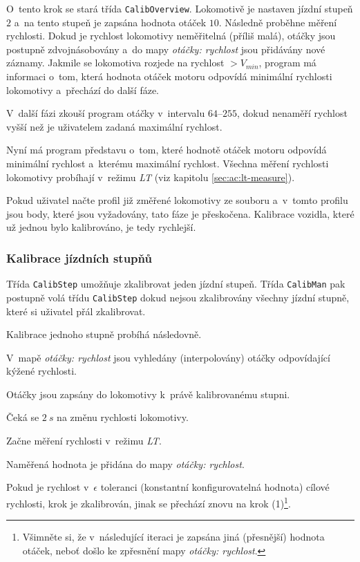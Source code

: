 O~tento krok se stará třída \texttt{CalibOverview}.
Lokomotivě je nastaven jízdní stupeň $2$ a~na tento stupeň je zapsána hodnota otáček
$10$. Následně proběhne měření rychlosti. Dokud je rychlost lokomotivy
neměřitelná (příliš malá), otáčky jsou postupně zdvojnásobovány a~do mapy
\textit{otáčky: rychlost} jsou přidávány nové záznamy. Jakmile se lokomotiva
rozjede na rychlost $> V_{min}$, program má informaci o~tom, která hodnota
otáček motoru odpovídá minimální rychlosti lokomotivy a~přechází do další fáze.

V~další fázi zkouší program otáčky v~intervalu $64$--$255$, dokud nenaměří
rychlost vyšší než je uživatelem zadaná maximální rychlost.

Nyní má program představu o~tom, které hodnotě otáček motoru odpovídá minimální
rychlost a~kterému maximální rychlost. Všechna měření rychlosti lokomotivy
probíhají v~režimu \textit{\gls{LT}} (viz kapitolu \ref{sec:ac:lt-measure}).

Pokud uživatel načte profil již změřené lokomotivy ze souboru a~v~tom\-to profilu
jsou body, které jsou vyžadovány, tato fáze je přeskočena. Kalibrace vozidla,
které už jednou bylo kalibrováno, je tedy rychlejší.

\subsubsection{Kalibrace jízdních stupňů}

Třída \texttt{CalibStep} umožňuje zkalibrovat jeden jízdní stupeň. Třída
\texttt{CalibMan} pak postupně volá třídu \texttt{CalibStep} dokud nejsou
zkalibrovány všechny jízdní stupně, které si uživatel přál zkalibrovat.

Kalibrace jednoho stupně probíhá následovně.

\begin{compactenum}
\item V~mapě \textit{otáčky: rychlost} jsou vyhledány (interpolovány) otáčky odpovídající
      kýžené rychlosti.
\item Otáčky jsou zapsány do lokomotivy k~právě kalibrovanému stup\-ni.
\item Čeká se $2\ s$ na změnu rychlosti lokomotivy.
\item Začne měření rychlosti v~režimu \textit{\gls{LT}}.
\item Naměřená hodnota je přidána do mapy \textit{otáčky: rychlost}.
\item Pokud je rychlost v~$\epsilon$ toleranci (konstantní konfigurovatelná hodnota)
      cílové rychlosti, krok je zkalibrován, jinak se přechází znovu na krok
      (1)\footnote{Všimněte si, že v~následující iteraci je zapsána jiná (přesnější)
      hodnota otáček, neboť došlo ke zpřesnění mapy \textit{otáčky: rychlost}.}.
\end{compactenum}

